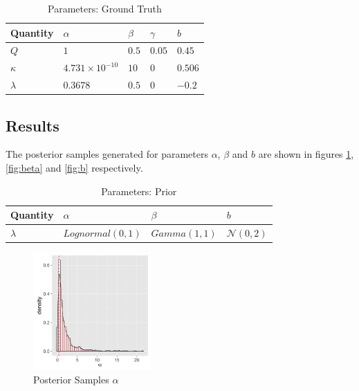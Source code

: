 \documentclass{article}
\begin{document}
\begin{table}[t]
  \caption{Parameters: Ground Truth}
  \label{tab:ground-truth}
  \centering
  \begin{tabular}{lllll}
    \toprule
    \cmidrule{1-2}
    Quantity     & $\alpha$     & $\beta$ & $\gamma$ & $b$ \\
    \midrule
    $Q$ & $1$  & $0.5$ & $0.05$  & $0.45$     \\
    $\kappa$  & $4.731 \times 10^{-10}$ & $10$  & $0$ & $0.506$ \\
    $\lambda$ & $0.3678$ & $0.5$  & $0$ & $-0.2$ \\
    \bottomrule
  \end{tabular}
\end{table}

\subsection*{Results}

The posterior samples generated for parameters $\alpha$, $\beta$ and $b$ are shown
in figures \ref{fig:alpha}, \ref{fig:beta} and \ref{fig:b} respectively.

\begin{table}[t]
  \caption{Parameters: Prior}
  \label{tab:prior}
  \centering
  \begin{tabular}{llll}
    \toprule
    \cmidrule{1-2}
    Quantity     & $\alpha$     & $\beta$ & $b$ \\
    \midrule
    $\lambda$ & $Lognormal(0, 1)$ & $Gamma(1, 1)$ & $\mathcal{N}(0, 2)$ \\
    \bottomrule
  \end{tabular}
\end{table}


\begin{figure}[h] 
  \centering
  \includegraphics[width=0.4\textwidth]{histogram_alpha_posterior}
  \caption{Posterior Samples $\alpha$}
  \label{fig:alpha}
\end{figure}
\end{document}
